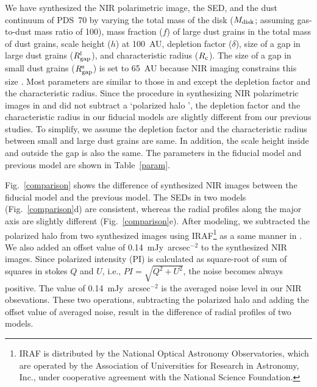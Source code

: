\documentclass[apj]{emulateapj-rtx4}
\begin{document}
  We have synthesized the NIR polarimetric image, the SED, and the dust continuum of PDS~70 by varying the total mass of the disk 
  ($M_{\rm disk}$; assuming gas-to-dust mass ratio of 100), mass fraction ($f$) of large dust grains in the total mass of dust grains,
  scale height ($h$) at 100~AU, depletion factor ($\delta$), size of a gap in large dust grains ($R_{\rm gap}^{\rm l}$),
  and characteristic radius ($R_{\rm c}$). The size of a gap in small dust grains ($R_{\rm gap}^{\rm s}$) 
  is set to 65~AU because NIR imaging 
  constrains  
  this size \citep{hash12,dong12b}. 
  Most parameters 
  are similar to those in \citet{hash12} and \citet{dong12b} 
  except the depletion factor and the characteristic radius. Since the procedure in synthesizing NIR polarimetric images 
  in \citet{hash12} and \citet{dong12b} 
    did not subtract a
  `polarized halo \citep[described in \S~2.1 in][]{hash12}', the depletion factor and 
  the characteristic radius in our fiducial models are slightly different from our previous studies. To simplify, 
  we assume
  the depletion factor and the characteristic radius between small and large dust grains are same. In addition, 
  the scale height inside and outside the gap is also the same. The parameters in the fiducial model 
  and previous model 
  are shown in Table~\ref{param}. 

    Fig.~\ref{comparison} shows the difference of synthesized NIR images between the fiducial model and the previous model.  
    The SEDs in two models (Fig.~\ref{comparison}d) are consistent, 
    whereas the radial profiles along the major axis are slightly different (Fig.~\ref{comparison}e). After modeling,
    we subtracted the polarized halo from two synthesized images using IRAF\footnote{
  IRAF is distributed by the National Optical Astronomy Observatories, which are operated
  by the Association of Universities for Research in Astronomy,
  Inc., under cooperative agreement with the National Science Foundation.}
    as a same manner in \citet{hash12}.
    We also added an offset value of 0.14~mJy~arcsec$^{-2}$ to the synthesized NIR images.
    Since polarized intensity (PI) is calculated as square-root of sum of squares in stokes $Q$ and $U$,
    i.e., $PI = \sqrt{Q^{2} + U^{2}}$, the noise becomes always positive. The value of 0.14~mJy~arcsec$^{-2}$ is the averaged
    noise level in our NIR obsevations. These two operations, subtracting the polarized halo and adding the offset value of
    averaged noise, result in the difference of radial profiles of two models.
\end{document}
